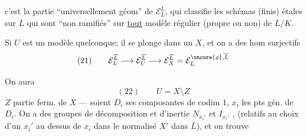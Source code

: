 
c'est la partie ``universellement géom'' de $\mathcal E_L^{\overline L}$,    qui classifie les schémas (finis) étales sur $L$ qui sont ``non ramifiés'' sur \uline{tout} modèle  régulier (propre ou non) de $L/K$.


Si $U$ est un modèle quelconque; il se plonge dans un $X$, et on a des hom surjectifs
\[
(21)\qquad \mathcal E_L^{\overline L}\longrightarrow\mathcal E_U^{\overline L}\longrightarrow\mathcal E_X^{\overline L}=\mathcal E_L^{\unsure{g},\overline L}
\]

On aura 
\[
(22)\qquad U=X\setminus Z
\]
$Z$ partie ferm. de $X$ --- soient $D_i$ ses composantes de codim $1$, $x_i$ les pts gén. de $D_i$. On a des groupes de décomposition et d'inertie $N_{x_i'}$ et $I_{x_i'}$ , (relatifs au choix d'un $x_i'$ au dessus de $x_i$ dans le normalisé $X'$ dans $\overline L$), et on trouve

